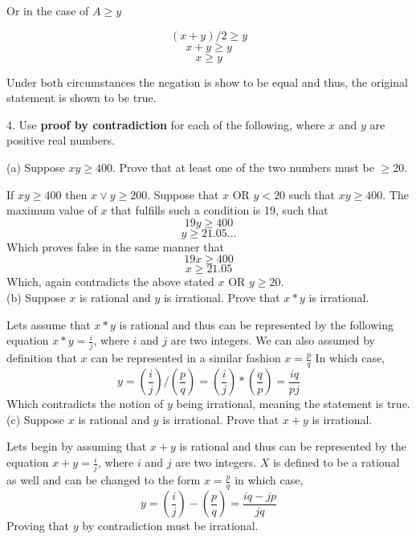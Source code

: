 \documentclass[10pt]{article}
\begin{document}
Or in the case of $A \geq y$

$$(x + y)/2 \geq y$$
$$x + y \geq y$$
$$x \geq y$$

Under both circumstances the negation is show to be equal and thus, the original statement is shown to be true. 

4. Use \textbf{proof by contradiction} for each of the following, where $x$ and $y$ are positive real numbers.

(a) Suppose $xy \geq 400$.  Prove that at least one of the two numbers must be $\geq 20$.

If $xy \geq 400$ then $x \vee y \geq 200$.  Suppose that $x$ OR $y < 20$ such that $xy \geq 400$.  The maximum value of $x$ that fulfills such a condition is 19, such that
$$19y \geq 400$$
$$y \geq 21.05...$$
Which proves false in the same manner that
$$19x \geq 400$$
$$x \geq 21.05$$
Which, again contradicts the above stated $x$ OR $y \geq 20$.\\

(b) Suppose $x$ is rational and $y$ is irrational.  Prove that $x * y$ is irrational.

Lets assume that $x * y$ is rational and thus can be represented by the following equation
$x * y = \frac{i}{j}$, where $i$ and $j$ are two integers.  We can also assumed by definition that $x$ can be represented in a similar fashion $x = \frac{p}{q}$  In which case,
$$y = (\frac{i}{j}) / (\frac{p}{q}) = (\frac{i}{j}) * (\frac{q}{p}) = \frac{iq}{pj}$$
Which contradicts the notion of $y$ being irrational, meaning the statement is true.\\

(c) Suppose $x$ is rational and $y$ is irrational.  Prove that $x + y$ is irrational.

Lets begin by assuming that $x + y$ is rational and thus can be represented by the equation $x + y = \frac{i}{j}$, where $i$ and $j$ are two integers.  $X$ is defined to be a rational as well and can be changed to the form $x = \frac{p}{q}$  in which case,
$$y = (\frac{i}{j}) - (\frac{p}{q}) = \frac{iq-jp}{jq}$$
Proving that $y$ by contradiction must be irrational.
\end{document}
